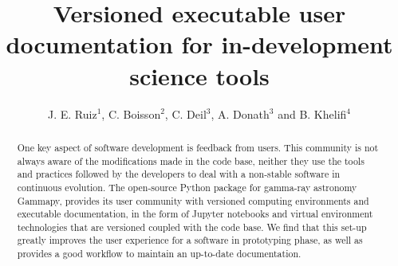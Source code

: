 \documentclass[11pt,twoside]{article}
\begin{document}
\title{Versioned executable user documentation for in-development science tools}

\author{J. E. Ruiz$^1$, C. Boisson$^2$, C. Deil$^3$, A. Donath$^3$ and B. Khelifi$^4$}




\begin{abstract}
One key aspect of software development is feedback from users. This community is not always aware of the
modifications made in the code base, neither they use the tools and practices followed by the developers to deal with
a non-stable software in continuous evolution.  The open-source Python package for gamma-ray astronomy Gammapy, provides 
its user community with versioned computing environments and executable documentation, in the form of Jupyter
notebooks and virtual environment technologies that are versioned coupled with the code base. We find that this 
set-up greatly improves the user experience for a software in prototyping phase, as well as provides a good workflow to
maintain an up-to-date documentation.
\end{abstract}

\end{document}
